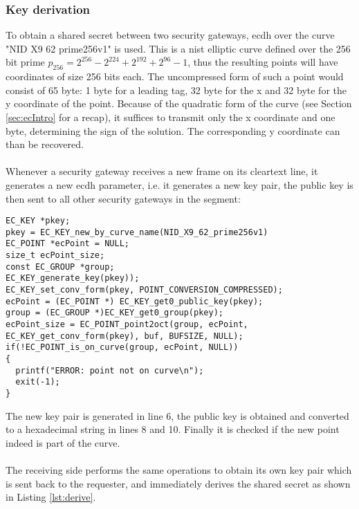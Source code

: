 \subsubsection{Key derivation}
To obtain a shared secret between two security gateways, \gls{ecdh} over the curve
"NID X9 62 prime256v1" is used. This is a \gls{nist} elliptic curve defined over the 256 bit prime
$p_{256} = 2^{256} - 2^{224} + 2^{192} + 2^{96} - 1$, thus the resulting points will have coordinates of size 256 bits each. The uncompressed form of such a point would consist of 65
byte: 1 byte for a leading tag, 32 byte for the x and 32 byte for the y coordinate of the point. Because of the quadratic form of the curve (see Section \ref{sec:ecIntro} for a recap),
it suffices to transmit only the x coordinate and one byte, determining the sign of the solution. The corresponding y coordinate can than be recovered.
\\
\\
Whenever a security gateway receives a new frame on its cleartext line, it generates a new \gls{ecdh} parameter, i.e. it generates a new key pair, the public key is then sent to all
other security gateways in the segment:
\begin{lstlisting}[style=cStyle,caption={Generating a \gls{ecdh} parameter},label=lst:genEC]
EC_KEY *pkey;
pkey = EC_KEY_new_by_curve_name(NID_X9_62_prime256v1)
EC_POINT *ecPoint = NULL;
size_t ecPoint_size;
const EC_GROUP *group;
EC_KEY_generate_key(pkey));
EC_KEY_set_conv_form(pkey, POINT_CONVERSION_COMPRESSED);
ecPoint = (EC_POINT *) EC_KEY_get0_public_key(pkey);
group = (EC_GROUP *)EC_KEY_get0_group(pkey);
ecPoint_size = EC_POINT_point2oct(group, ecPoint, EC_KEY_get_conv_form(pkey), buf, BUFSIZE, NULL);
if(!EC_POINT_is_on_curve(group, ecPoint, NULL))
{
  printf("ERROR: point not on curve\n");
  exit(-1);
}
\end{lstlisting}
The new key pair is generated in line 6, the public key is obtained and converted to a hexadecimal string in lines 8 and 10. Finally it is checked if the new point indeed is part of
the curve.
\\
\\
The receiving side performs the same operations to obtain its own key pair which is sent back to the requester, and immediately derives the shared secret as shown in Listing \ref{lst:derive}.

